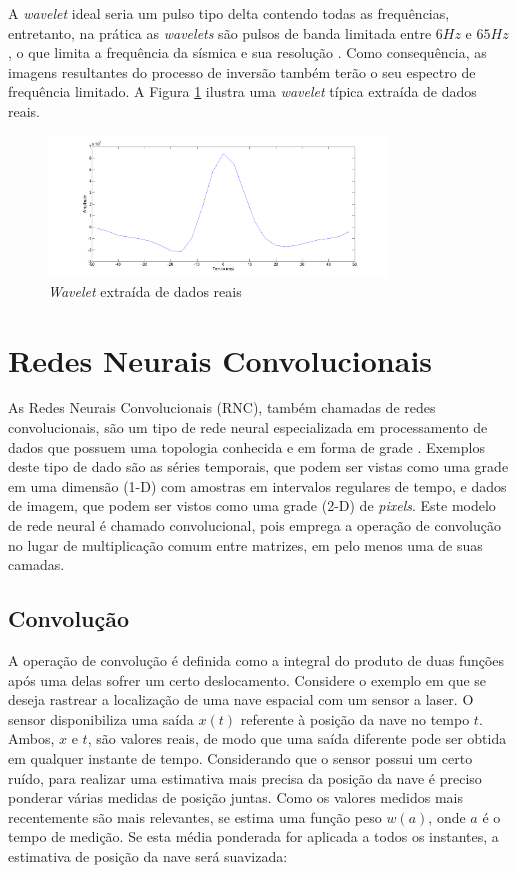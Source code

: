 A \textit{wavelet} ideal seria um pulso tipo delta contendo
todas as frequências, entretanto, na prática as
\textit{wavelets} são pulsos de banda limitada entre $6Hz$ e $65Hz$, o que
limita a frequência da sísmica e sua resolução \citep[p. 11]{sen_livro}.
Como consequência, as imagens resultantes do processo de inversão também terão
o seu espectro de frequência limitado. A Figura \ref{fig:wavelet} ilustra uma
\textit{wavelet} típica extraída de dados reais.
\begin{figure}[htp]
\begin{center}
  \includegraphics[width=0.8\textwidth]{fig/wavelet}
  \caption{\textit{Wavelet} extraída de dados reais}
  \label{fig:wavelet}
\end{center}
\end{figure}

\section{Redes Neurais Convolucionais}
As Redes Neurais Convolucionais (RNC), também chamadas de redes convolucionais,
são um tipo de rede neural especializada em processamento de dados que possuem uma
topologia conhecida e em forma de grade \citep{Gdfl16}. Exemplos deste tipo de dado são as séries
temporais, que podem ser vistas como uma grade em uma dimensão (1-D) com amostras
em intervalos regulares de tempo, e dados de imagem, que podem ser vistos como
uma grade (2-D) de \textit{pixels}. Este modelo de rede neural é chamado convolucional,
pois emprega a operação de convolução no lugar de multiplicação comum entre matrizes,
em pelo menos uma de suas camadas.

\subsection{Convolução}
A operação de convolução é definida como a integral do produto de duas funções após uma delas sofrer um
certo deslocamento. Considere o exemplo em que se deseja rastrear a localização de uma
nave espacial com um sensor a laser. O sensor disponibiliza uma saída $x(t)$ referente à posição da nave
no tempo $t$. Ambos, $x$ e $t$, são valores reais, de modo que uma saída diferente pode ser obtida
em qualquer instante de tempo. Considerando que o sensor possui um certo ruído, para realizar uma
estimativa mais precisa da posição da nave é preciso ponderar várias medidas de posição juntas.
Como os valores medidos mais recentemente são mais relevantes, se estima uma função peso
$w(a)$, onde $a$ é o tempo de medição. Se esta média ponderada for aplicada a todos os instantes,
a estimativa de posição da nave será suavizada:

